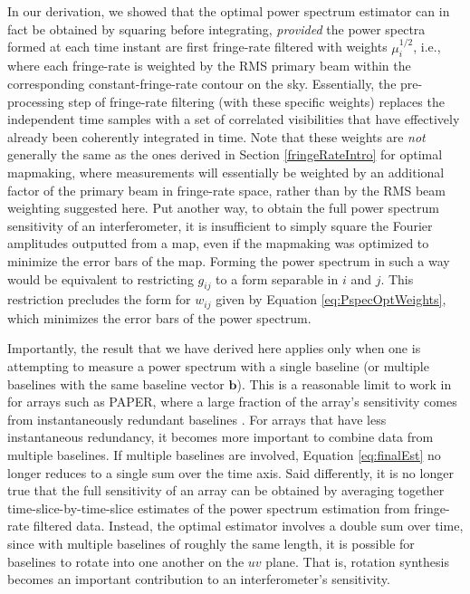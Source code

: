 \documentclass[twocolumn,apj,numberedappendix]{emulateapj}
\begin{document}
In our derivation, we showed that the optimal power spectrum estimator can in fact be obtained by squaring before integrating, \emph{provided} the power spectra formed at each time instant are first fringe-rate filtered with weights $ \mu_i^{1/2}$, i.e., where each fringe-rate is weighted by the RMS primary beam within the corresponding constant-fringe-rate contour on the sky. Essentially, the pre-processing step of fringe-rate filtering (with these specific weights) replaces the independent time samples with a set of correlated visibilities that have effectively already been coherently integrated in time. Note that these weights are \emph{not} generally the same as the ones derived in Section \ref{fringeRateIntro} for optimal mapmaking, where measurements will essentially be weighted by an additional factor of the primary beam in fringe-rate space, rather than by the RMS beam weighting suggested here. Put another way, to obtain the full power spectrum sensitivity of an interferometer, it is insufficient
to simply square the Fourier amplitudes outputted from a map, even if the mapmaking was optimized to minimize the error bars of the map.  Forming the power spectrum in such a way would be equivalent to restricting $g_{ij}$ to a form separable in $i$ and $j$. This restriction precludes the form for $w_{ij}$ given by Equation \eqref{eq:PspecOptWeights}, which minimizes the error bars of the power spectrum.

Importantly, the result that we have derived here applies only when one is attempting to measure a power spectrum with a single baseline (or multiple baselines with the same baseline vector $\mathbf{b}$). This is a reasonable limit to work in for arrays such as PAPER, where a large fraction of the array's sensitivity comes from instantaneously redundant baselines \citep{parsons_et_al2012a}. For arrays that have less instantaneous redundancy, it becomes more important to combine data from multiple baselines. If multiple baselines are involved, Equation \eqref{eq:finalEst} no longer reduces to a single sum over the time axis. Said differently, it is no longer true that the full sensitivity of an array can be obtained by averaging together time-slice-by-time-slice estimates of the power spectrum estimation from fringe-rate filtered data. Instead, the optimal estimator involves a double sum over time, since with multiple baselines of roughly the same length, it is possible for baselines to rotate into one another on the $uv$ plane. That is, rotation synthesis becomes an important contribution to an interferometer's sensitivity.
\end{document}
